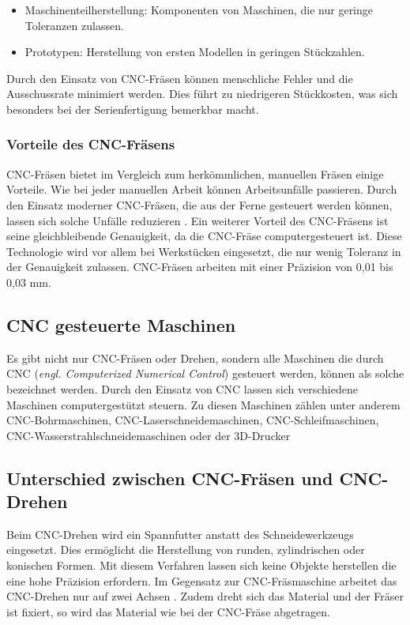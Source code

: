 \begin{itemize}
	\item Maschinenteilherstellung: Komponenten von Maschinen, die nur geringe Toleranzen zulassen.
	\item Prototypen: Herstellung von ersten Modellen in geringen Stückzahlen.
\end{itemize}

Durch den Einsatz von CNC-Fräsen können menschliche Fehler und die Ausschussrate minimiert werden. Dies führt zu niedrigeren Stückkosten, was sich besonders bei der Serienfertigung bemerkbar macht.\\  \parencite{CNCFraesen3}


\subsubsection{Vorteile des CNC-Fräsens}
CNC-Fräsen bietet im Vergleich zum herkömmlichen, manuellen Fräsen einige Vorteile. Wie bei jeder manuellen Arbeit können Arbeitsunfälle passieren. Durch den Einsatz moderner CNC-Fräsen, die aus der Ferne gesteuert werden können, lassen sich solche Unfälle reduzieren \parencite{CNCFraesenVorteile}. Ein weiterer Vorteil des CNC-Fräsens ist seine gleichbleibende Genauigkeit, da die CNC-Fräse computergesteuert ist. Diese Technologie wird vor allem bei Werkstücken eingesetzt, die nur wenig Toleranz in der Genauigkeit zulassen. CNC-Fräsen arbeiten mit einer Präzision von 0,01 bis 0,03 mm. \\


\subsection{CNC gesteuerte Maschinen}
Es gibt nicht nur CNC-Fräsen oder Drehen, sondern alle Maschinen die durch CNC (\textit{engl. Computerized Numerical Control}) gesteuert werden, können als solche bezeichnet werden. Durch den Einsatz von CNC lassen sich  verschiedene Maschinen computergestützt steuern. Zu diesen Maschinen zählen unter anderem CNC-Bohrmaschinen,  CNC-Laserschneidemaschinen, CNC-Schleifmaschinen, CNC-Wasserstrahlschneidemaschinen oder der 3D-Drucker \parencite{ArtenCNCMaschinen}

\newpage
\subsection{Unterschied zwischen CNC-Fräsen und CNC-Drehen}
Beim CNC-Drehen wird ein Spannfutter anstatt des Schneidewerkzeugs eingesetzt. Dies ermöglicht die Herstellung von runden, zylindrischen oder konischen Formen. Mit diesem Verfahren lassen sich keine Objekte herstellen die eine hohe Präzision erfordern. Im Gegensatz zur CNC-Fräsmaschine arbeitet das CNC-Drehen nur auf zwei Achsen \parencite{CNCDrehenUnterschied}. Zudem dreht sich das Material und der Fräser ist fixiert, so wird das Material wie bei der CNC-Fräse abgetragen. \\

